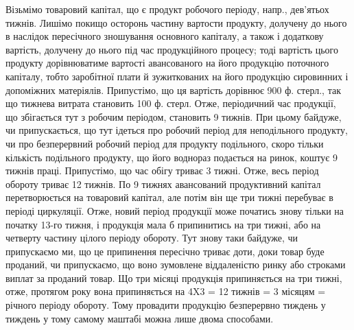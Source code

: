 Візьмімо товаровий капітал, що є продукт робочого періоду, напр.,
дев’ятьох тижнів. Лишімо покищо осторонь частину вартости продукту,
долучену до нього в наслідок пересічного зношування основного капіталу,
а також і додаткову вартість, долучену до нього під час продукційного
процесу; тоді вартість цього продукту дорівнюватиме вартості
авансованого на його продукцію поточного капіталу, тобто заробітної плати
й зужиткованих на його продукцію сировинних і допоміжних матеріялів.
Припустімо, що ця вартість дорівнює 900 ф. стерл., так що тижнева
витрата становить 100 ф. стерл. Отже, періодичний час продукції, що
збігається тут з робочим періодом, становить 9 тижнів. При цьому байдуже,
чи припускається, що тут ідеться про робочий період для неподільного
продукту, чи про безперервний робочий період для продукту
подільного, скоро тільки кількість подільного продукту, що його воднораз
подається на ринок, коштує 9 тижнів праці. Припустімо, що час
обігу триває 3 тижні. Отже, весь період обороту триває 12 тижнів.
По 9 тижнях авансований продуктивний капітал перетворюється на товаровий
капітал, але потім він ще три тижні перебуває в періоді циркуляції.
Отже, новий період продукції може початись знову тільки на початку
13-го тижня, і продукція мала б припинитись на три тижні, або на
четверту частину цілого періоду обороту. Тут знову таки байдуже, чи
припускаємо ми, що це припинення пересічно триває доти, доки товар
буде проданий, чи припускаємо, що воно зумовлене віддаленістю ринку
або строками виплат за проданий товар. Що три місяці продукція
припиняється на три тижні, отже, протягом року вона припиняється на
4X3 = 12 тижнів = 3 місяцям =  річного періоду обороту. Тому
провадити продукцію безперервно тиждень у тиждень у тому самому
маштабі можна лише двома способами.

